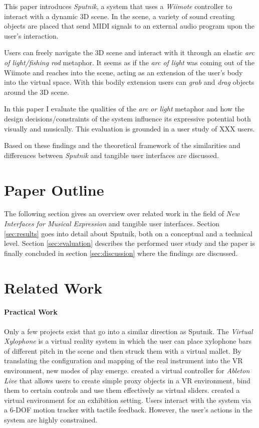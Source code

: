 \documentclass[10pt,a4paper]{scrartcl}
\begin{document}
This paper introduces \emph{Sputnik}, a system that uses a \emph{Wiimote} controller to interact with a dynamic 3D scene. In the scene, a variety of sound creating objects are placed that send MIDI signals to an external audio program upon the user's interaction. 

Users can freely navigate the 3D scene and interact with it through an elastic \emph{arc of light/fishing rod} metaphor. It seems as if the \emph{arc of light} was coming out of the Wiimote and reaches into the scene, acting as an extension of the user's body into the virtual space. With this bodily extension users can \emph{grab} and \emph{drag} objects around the 3D scene.



In this paper I evaluate the qualities of the \emph{arc or light} metaphor and how the design decisions/constraints of the system influence its expressive potential both visually and musically. This evaluation is grounded in a user study of XXX users.

Based on these findings and the theoretical framework of \cite{Ullmer2000} the similarities and differences between \emph{Sputnik} and tangible user interfaces are discussed. 


\section{Paper Outline}
The following section gives an overview over related work in the field of \emph{New Interfaces for Musical Expression} and tangible user interfaces. Section \ref{sec:results} goes into detail about Sputnik, both on a conceptual and a technical level. Section \ref{sec:evaluation} describes the performed user study and the paper is finally concluded in section \ref{sec:discussion} where the findings are discussed.


\section{Related Work}
\paragraph{Practical Work}
Only a few projects exist that go into a similar direction as Sputnik. The \emph{Virtual Xylophone}\cite{Maki-Patola2005} is a virtual reality system in which the user can place xylophone bars of different pitch in the scene and then struck them with a virtual mallet. By translating the configuration and mapping of the real instrument into the VR environment, new modes of play emerge.
\cite{Zappi2010} created a virtual controller for \emph{Ableton Live} that allows users to create simple proxy objects in a VR environment, bind them to certain controls and use them effectively as virtual sliders. \cite{Rodet2005} created a virtual environment for an exhibition setting. Users interact with the system via a 6-DOF motion tracker with tactile feedback. However, the user's actions in the system are highly constrained.
\end{document}
